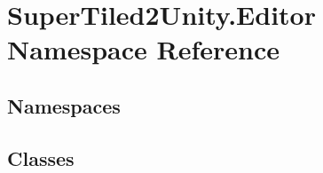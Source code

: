 \hypertarget{namespace_super_tiled2_unity_1_1_editor}{}\section{Super\+Tiled2\+Unity.\+Editor Namespace Reference}
\label{namespace_super_tiled2_unity_1_1_editor}
\subsection*{Namespaces}
\begin{DoxyCompactItemize}
\end{DoxyCompactItemize}
\subsection*{Classes}
